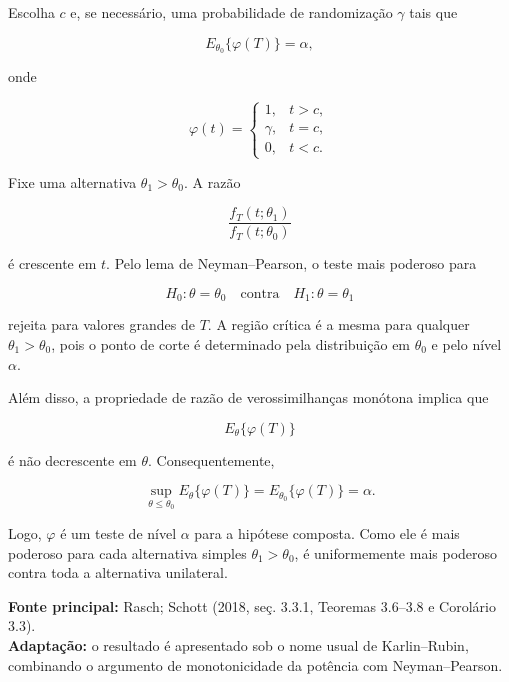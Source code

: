\documentclass[
  letterpaper,
  DIV=11,
  numbers=noendperiod]{scrreprt}
\begin{document}
Escolha \(c\) e, se necessário, uma probabilidade de randomização
\(\gamma\) tais que

\[
E_{\theta_0}\{\varphi(T)\}=\alpha,
\]

onde

\[
\varphi(t)=
\begin{cases}
1,&t>c,\\
\gamma,&t=c,\\
0,&t<c.
\end{cases}
\]

Fixe uma alternativa \(\theta_1>\theta_0\). A razão

\[
\frac{f_T(t;\theta_1)}{f_T(t;\theta_0)}
\]

é crescente em \(t\). Pelo lema de Neyman--Pearson, o teste mais
poderoso para

\[
H_0:\theta=\theta_0
\quad\text{contra}\quad
H_1:\theta=\theta_1
\]

rejeita para valores grandes de \(T\). A região crítica é a mesma para
qualquer \(\theta_1>\theta_0\), pois o ponto de corte é determinado pela
distribuição em \(\theta_0\) e pelo nível \(\alpha\).

Além disso, a propriedade de razão de verossimilhanças monótona implica
que

\[
E_\theta\{\varphi(T)\}
\]

é não decrescente em \(\theta\). Consequentemente,

\[
\sup_{\theta\leq\theta_0}
E_\theta\{\varphi(T)\}
=
E_{\theta_0}\{\varphi(T)\}
=
\alpha.
\]

Logo, \(\varphi\) é um teste de nível \(\alpha\) para a hipótese
composta. Como ele é mais poderoso para cada alternativa simples
\(\theta_1>\theta_0\), é uniformemente mais poderoso contra toda a
alternativa unilateral.

\begin{tcolorbox}[enhanced jigsaw, colback=white, leftrule=.75mm, colbacktitle=quarto-callout-note-color!10!white, breakable, titlerule=0mm, bottomtitle=1mm, title=\textcolor{quarto-callout-note-color}{\faInfo}\hspace{0.5em}{Fonte da demonstração}, colframe=quarto-callout-note-color-frame, toprule=.15mm, opacityback=0, bottomrule=.15mm, opacitybacktitle=0.6, arc=.35mm, toptitle=1mm, rightrule=.15mm, coltitle=black, left=2mm]

\textbf{Fonte principal:} Rasch; Schott (2018, seç. 3.3.1, Teoremas
3.6--3.8 e Corolário 3.3).\\
\textbf{Adaptação:} o resultado é apresentado sob o nome usual de
Karlin--Rubin, combinando o argumento de monotonicidade da potência com
Neyman--Pearson.

\end{tcolorbox}
\end{document}
